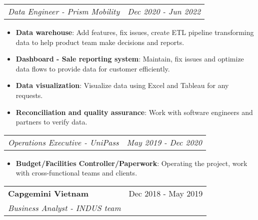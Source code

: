 \documentclass[letterpaper,11pt]{article}
\makeatletter
\newcommand{\resumeItem}[2]{
  \item\small{
    \textbf{#1}{: #2 \vspace{-2pt}}
  }
}
\newcommand{\resumeItemNornal}[1]{
  \item\small{
    {#1 \vspace{-2pt}}
  }
}
\newcommand{\resumeSubheading}[4]{
  \vspace{-1pt}
  \item
    \begin{tabular*}{0.97\textwidth}{l@{\extracolsep{\fill}}r}
      \textbf{#1} & #2 \\
      \textit{\small#3} & \textit{\small #4} \\
    \end{tabular*}\vspace{-5pt}
}
\newcommand{\resumeSubheadingNoTitle}[2]{
  \vspace{-1pt}
    \begin{tabular*}{0.97\textwidth}{l@{\extracolsep{\fill}}r}
      \textit{\small#1} & \textit{\small#2}
    \end{tabular*}\vspace{-5pt}
}
\newcommand{\resumeSubItemNormal}[1]{\resumeItemNornal{#1}\vspace{-4pt}}
\newcommand{\resumeItemListStart}{\begin{itemize}}
\newcommand{\resumeItemListEnd}{\end{itemize}\vspace{-5pt}}
\makeatother
\begin{document}
      \resumeSubheadingNoTitle
      {Data Engineer - Prism Mobility}{Dec 2020 - Jun 2022}
      \resumeItemListStart
        \resumeItem{Data warehouse}
        {Add features, fix issues, create ETL pipeline transforming data to help product team make decisions and reports.}
        \resumeItem{Dashboard - Sale reporting system}
        {Maintain, fix issues and optimize data flows to provide data for customer efficiently.} 
        \resumeItem{Data visualization}
        {Visualize data using Excel and Tableau for any requests.}
        \resumeItem{Reconciliation and quality assurance}
        {Work with software engineers and partners to verify data.}
      \resumeItemListEnd
      \resumeSubheadingNoTitle
      {Operations Executive - UniPass}{May 2019 - Dec 2020}
      
      \resumeItemListStart
        \resumeItem{Budget/Facilities Controller/Paperwork}
          {Operating the project, work with cross-functional teams and clients.} 
      \resumeItemListEnd
      
    \resumeSubheading
      {Capgemini Vietnam}{Dec 2018 - May 2019}
      {Business Analyst - INDUS team}{}


\end{document}
